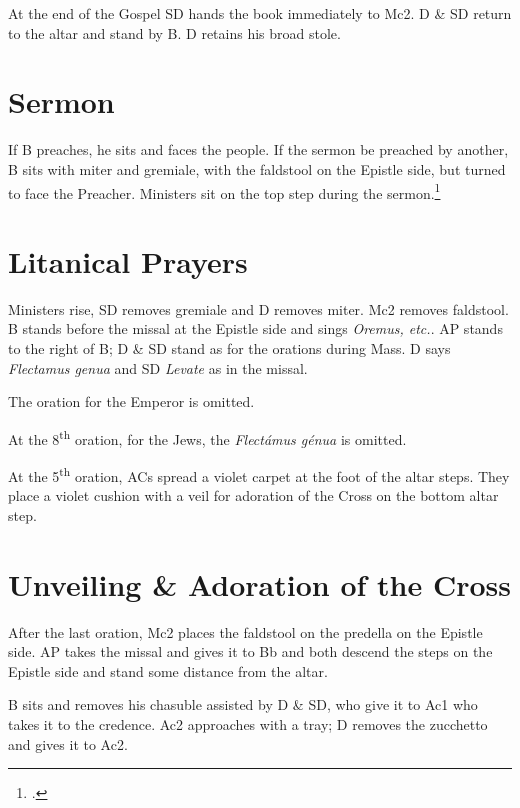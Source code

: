 {    \rubric At the end of the Gospel SD hands the book immediately to Mc2. D \&
    SD return to the altar and stand by B. D retains his broad stole.

\section{Sermon}

    \rubric If B preaches, he sits and faces the people. If the sermon be
    preached by another, B sits with miter and gremiale, with the faldstool on
    the Epistle side, but turned to face the Preacher. Ministers sit on the top
    step during the sermon.\footcite[][]{sterckyFP:2}

\section{Litanical Prayers}

    \rubric Ministers rise, SD removes gremiale and D removes miter. Mc2
    removes faldstool. B stands before the missal at the Epistle side and sings
    \textit{Oremus, etc.}. AP stands to the right of B; D \& SD stand as for
    the orations during Mass. D says \textit{Flectamus genua} and SD
    \textit{Levate} as in the missal.

    \rubric The oration for the Emperor is omitted.

    \rubric At the 8\textsuperscript{th} oration, for the Jews, the
    \textit{Flectámus génua} is omitted.

    \rubric At the 5\textsuperscript{th} oration, ACs spread a violet carpet at
    the foot of the altar steps. They place a violet cushion with a veil for
    adoration of the Cross on the bottom altar step.

\section{Unveiling \& Adoration of the Cross}

    \rubric After the last oration, Mc2 places the faldstool on the predella on
    the Epistle side. AP takes the missal and gives it to Bb and both descend
    the steps on the Epistle side and stand some distance from the altar.

    \rubric B sits and removes his chasuble assisted by D \& SD, who give it to
    Ac1 who takes it to the credence. Ac2 approaches with a tray; D removes the
    zucchetto and gives it to Ac2.

}

